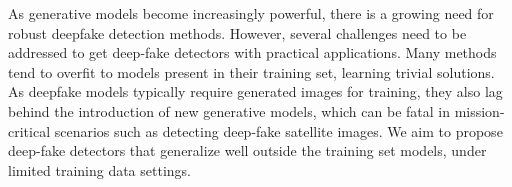 As generative models become increasingly powerful, there is a growing need for robust deepfake detection methods. However, several challenges need to be addressed to get deep-fake detectors with practical applications. Many methods tend to overfit to models present in their training set, learning trivial solutions. As deepfake models typically require generated images for training, they also lag behind the introduction of new generative models, which can be fatal in mission-critical scenarios such as detecting deep-fake satellite images. We aim to propose deep-fake detectors that generalize well outside the training set models, under limited training data settings. 